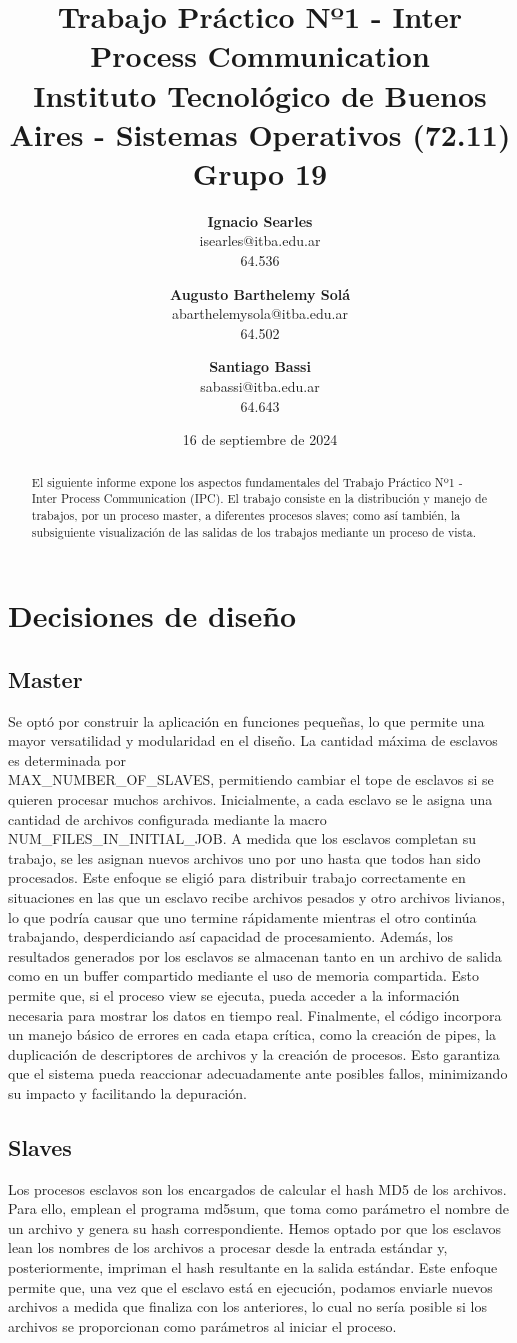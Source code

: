 \documentclass{article}
\title{\textbf{Trabajo Práctico Nº1 - Inter Process Communication} \\ [1ex]
\large Instituto Tecnológico de Buenos Aires - Sistemas Operativos (72.11) \\ [1ex]
\large Grupo 19}
\date{16 de septiembre de 2024}
\author{
\textbf{Ignacio Searles}\\
isearles@itba.edu.ar\\
64.536
\and
\textbf{Augusto Barthelemy Solá}\\
abarthelemysola@itba.edu.ar\\
64.502
\and
\textbf{Santiago Bassi}\\
sabassi@itba.edu.ar\\
64.643
}
\begin{document}
\maketitle
\begin{abstract}
El siguiente informe expone los aspectos fundamentales del Trabajo Práctico Nº1 - Inter Process Communication (IPC). El trabajo consiste en la distribución y manejo de trabajos, por un proceso master, a diferentes procesos slaves; como así también, la subsiguiente visualización de las salidas de los trabajos mediante un proceso de vista.
\end{abstract}
\section{Decisiones de diseño}
\subsection{Master}
Se optó por construir la aplicación en funciones pequeñas, lo que permite una mayor versatilidad y modularidad en el diseño. La cantidad máxima de esclavos es determinada por \\MAX\_NUMBER\_OF\_SLAVES, permitiendo cambiar el tope de esclavos si se quieren procesar muchos archivos. Inicialmente, a cada esclavo se le asigna una cantidad de archivos configurada mediante la macro NUM\_FILES\_IN\_INITIAL\_JOB. A medida que los esclavos completan su trabajo, se les asignan nuevos archivos uno por uno hasta que todos han sido procesados. Este enfoque se eligió para distribuir trabajo correctamente en situaciones en las que un esclavo recibe archivos pesados y otro archivos livianos, lo que podría causar que uno termine rápidamente mientras el otro continúa trabajando, desperdiciando así capacidad de procesamiento.
Además, los resultados generados por los esclavos se almacenan tanto en un archivo de salida como en un buffer compartido mediante el uso de memoria compartida. Esto permite que, si el proceso view se ejecuta, pueda acceder a la información necesaria para mostrar los datos en tiempo real.
Finalmente, el código incorpora un manejo básico de errores en cada etapa crítica, como la creación de pipes, la duplicación de descriptores de archivos y la creación de procesos. Esto garantiza que el sistema pueda reaccionar adecuadamente ante posibles fallos, minimizando su impacto y facilitando la depuración.
\subsection{Slaves}
Los procesos esclavos son los encargados de calcular el hash MD5 de los archivos. Para ello, emplean el programa md5sum, que toma como parámetro el nombre de un archivo y genera su hash correspondiente. Hemos optado por que los esclavos lean los nombres de los archivos a procesar desde la entrada estándar y, posteriormente, impriman el hash resultante en la salida estándar. Este enfoque permite que, una vez que el esclavo está en ejecución, podamos enviarle nuevos archivos a medida que finaliza con los anteriores, lo cual no sería posible si los archivos se proporcionan como parámetros al iniciar el proceso.
\end{document}
